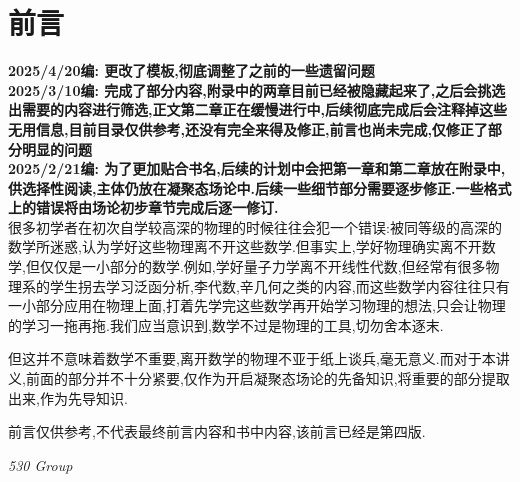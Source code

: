 \chapter*{前言}



\textbf{2025/4/20编: 更改了模板,彻底调整了之前的一些遗留问题}\\

\textbf{2025/3/10编: 完成了部分内容,附录中的两章目前已经被隐藏起来了,之后会挑选出需要的内容进行筛选,正文第二章正在缓慢进行中,后续彻底完成后会注释掉这些无用信息,目前目录仅供参考,还没有完全来得及修正,前言也尚未完成,仅修正了部分明显的问题}\\

\textbf{2025/2/21编: 为了更加贴合书名,后续的计划中会把第一章和第二章放在附录中,供选择性阅读,主体仍放在凝聚态场论中.后续一些细节部分需要逐步修正.一些格式上的错误将由场论初步章节完成后逐一修订.}\\


很多初学者在初次自学较高深的物理的时候往往会犯一个错误:被同等级的高深的数学所迷惑,认为学好这些物理离不开这些数学.但事实上,学好物理确实离不开数学,但仅仅是一小部分的数学.例如,学好量子力学离不开线性代数,但经常有很多物理系的学生拐去学习泛函分析,李代数,辛几何之类的内容,而这些数学内容往往只有一小部分应用在物理上面,打着先学完这些数学再开始学习物理的想法,只会让物理的学习一拖再拖.我们应当意识到,数学不过是物理的工具,切勿舍本逐末.

但这并不意味着数学不重要,离开数学的物理不亚于纸上谈兵,毫无意义.而对于本讲义,前面的部分并不十分紧要,仅作为开启凝聚态场论的先备知识,将重要的部分提取出来,作为先导知识.%

前言仅供参考,不代表最终前言内容和书中内容,该前言已经是第四版.




\begin{flushright}
	\textit{530 Group}
\end{flushright}
